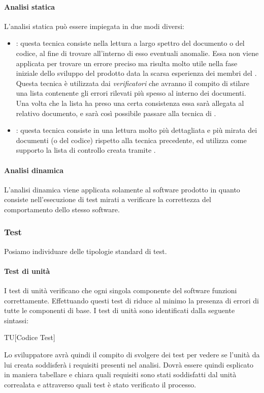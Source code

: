 \paragraph{Analisi statica}
L'analisi statica può essere impiegata in due modi diversi:
\begin{itemize}
  \item \textbf{}: questa tecnica  consiste nella
  lettura a largo spettro del documento o del codice, al fine di trovare all'interno di esso eventuali anomalie. Essa non viene applicata per trovare un errore preciso ma risulta
  molto utile nella fase iniziale dello sviluppo del prodotto data la scarsa
  esperienza dei membri del . Questa tecnica è utilizzata dai \textit{verificatori}
  che avranno il compito di stilare una lista contenente gli errori rilevati più
  spesso al interno dei documenti. Una volta che la lista ha preso una certa consistenza essa sarà allegata al relativo documento, e sarà così possibile passare alla tecnica di .
  \item \textbf{}: questa tecnica consiste in una
  lettura molto più dettagliata e più mirata dei documenti (o del codice) rispetto alla tecnica precedente, ed utilizza come supporto la lista di controllo creata tramite .
\end{itemize}

\paragraph{Analisi dinamica}
L'analisi dinamica viene applicata solamente al software prodotto in quanto consiste nell'esecuzione di test mirati a verificare la correttezza del comportamento dello stesso software.

\subsubsection{Test}
Posiamo individuare delle tipologie standard di test.

\paragraph{Test di unità}
I test di unità verificano che ogni singola componente del software funzioni correttamente. Effettuando questi test di riduce al minimo la presenza di errori di tutte le componenti di base. I test di unità sono identificati dalla seguente sintassi:
\begin{center}
  TU[Codice Test]
\end{center}
Lo sviluppatore avrà quindi il compito di svolgere dei test per vedere se l'unità da lui creata soddisferà i requisiti presenti nel analisi. Dovrà essere quindi esplicato in maniera tabellare e chiara quali requisiti sono stati soddisfatti dal unità correalata e attraverso quali test è stato verificato il processo.

